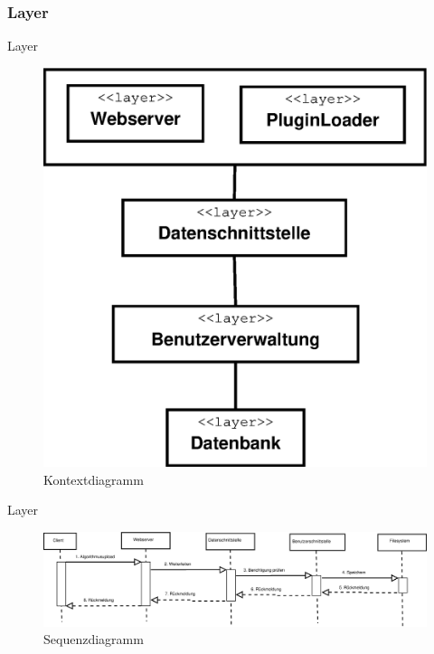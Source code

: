 \documentclass{beamer}
\begin{document}
		\subsubsection{Layer}
		\begin{frame}{Layer}
			\begin{figure}
				\centering
				\includegraphics[height=0.8\textheight]{Grafik/Diagramm/Layer}
				\caption{Kontextdiagramm}
				\label{fig:Kontext4}
			\end{figure}
		\end{frame}
		\begin{frame}{Layer}	
			\begin{figure}
				\centering
				\includegraphics[width=1\linewidth]{Grafik/Diagramm/Szenarios/Algorithmus}
				\caption{Sequenzdiagramm}
				\label{fig:Sequenz4}
			\end{figure}
		\end{frame}
		
\end{document}
